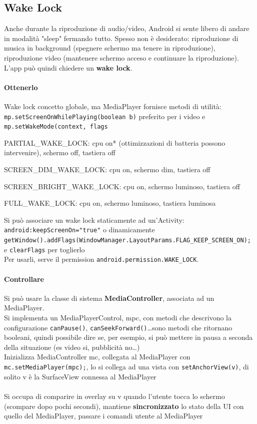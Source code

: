\documentclass[10pt]{book}
\begin{document}
\subsection{Wake Lock}
Anche durante la riproduzione di audio/video, Android si sente libero di andare in modalità "sleep" fermando tutto. Spesso non è desiderato: riproduzione di musica in background (spegnere schermo ma tenere in riproduzione), riproduzione video (mantenere schermo acceso e continuare la riproduzione).\\
L'app può quindi chiedere un \textbf{wake lock}.
\paragraph{Ottenerlo} Wake lock concetto globale, ma MediaPlayer fornisce metodi di utilità: \texttt{mp.setScreenOnWhilePlaying(boolean b)} preferito per i video e \texttt{mp.setWakeMode(context, flags}\begin{list}{}{}
	\item PARTIAL\_WAKE\_LOCK: cpu on* (ottimizzazioni di batteria possono intervenire), schermo off, tastiera off
	\item SCREEN\_DIM\_WAKE\_LOCK: cpu on, schermo dim, tastiera off
	\item SCREEN\_BRIGHT\_WAKE\_LOCK: cpu on, schermo luminoso, tastiera off
	\item FULL\_WAKE\_LOCK: cpu on, schermo luminoso, tastiera luminosa
\end{list}
Si può associare un wake lock staticamente ad un'Activity: \texttt{android:keepScreenOn="true"} o dinamicamente\\ \texttt{getWindow().addFlags(WindowManager.LayoutParams.FLAG\_KEEP\_SCREEN\_ON);} e \texttt{clearFlags} per toglierlo\\
Per usarli, serve il permission \texttt{android.permission.WAKE\_LOCK}.
\paragraph{Controllare} Si può usare la classe di sistema \textbf{MediaController}, associata ad un MediaPlayer.\\
Si implementa un MediaPlayerControl, mpc, con metodi che descrivono la configurazione \texttt{canPause()}, \texttt{canSeekForward()}\ldots sono metodi che ritornano booleani, quindi possibile dire se, per esempio, si può mettere in pausa a seconda della situazione (es video si, pubblicità no\ldots)\\
Inizializza MediaController mc, collegata al MediaPlayer con \texttt{mc.setMediaPlayer(mpc);}, lo si collega ad una vista con \texttt{setAnchorView(v)}, di solito v è la SurfaceView connessa al MediaPlayer\\\\
Si occupa di comparire in overlay su v quando l'utente tocca lo schermo (scompare dopo pochi secondi), mantiene \textbf{sincronizzato} lo stato della UI con quello del MediaPlayer, passare i comandi utente al MediaPlayer
\end{document}

